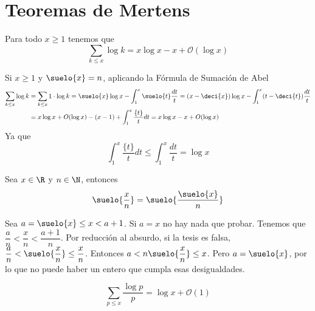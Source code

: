 \documentclass[TAN.tex]{subfiles}
\begin{document}
\section{Teoremas de Mertens}
\begin{teorema} Para todo $x\geq 1$ tenemos que
\[ \sum_{k≤x} {\log k} = x\log x -x+ \mathcal{O}(\log x) \]
\end{teorema}

\begin{dem}
Si $x\geq 1$ y $\suelo{ x } = n$, aplicando la Fórmula de Sumación de Abel
\begin{align*}
\sum_{k\leq x} \log k &= \sum_{k \leq x} 1 \cdot \log k = \suelo{ x }\log x - \int_1^x \suelo{ t } \frac{dt}{t} = (x-\deci{x})\log x - \int_1^x (t-\deci{t})\frac{dt}{t}\\
& =
x\log x + O(\log x) - (x-1) + \int_1^x\frac{\{t\}}{t}dt =  x\log x - x  + O(\log x)
\end{align*}
Ya que 
$$
 \int_1^x\frac{\{t\}}{t}dt  \leq  \int_1^x\frac{dt}{t} = \log x 
$$

\end{dem}
\begin{lemma}
Sea $x\in\R$ y $n\in\N$, entonces
$$
\suelo{\frac{x}{n}} = \suelo{\frac{\suelo{x}}{n}}
$$
\end{lemma}
\begin{dem}
Sea $a=\suelo{x}\leq x < a+1$. Si $a=x$ no hay nada que probar. Tenemos que $\dfrac{a}{n}<\dfrac{x}{n}<\dfrac{a+1}{n}$. Por reducción al absurdo, si la tesis es falsa, $\dfrac{a}{n}<\suelo{\dfrac{x}{n}}\leq \dfrac{x}{n}$. Entonces $a<n\suelo{\dfrac{x}{n}}\leq x$. Pero $a=\suelo{x}$, por lo que no puede haber un entero que cumpla esas desigualdades.
\end{dem}
\begin{teorema}
\[ \sum_{p≤x} \frac{\log p}{p} = \log x + \mathcal{O}(1) \]
\end{teorema}
\end{document}
